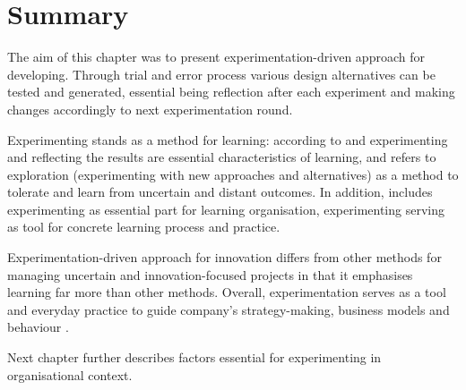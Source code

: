 \section{Summary}
The aim of this chapter was to present experimentation-driven approach for developing. Through trial and error process various design alternatives can be tested and generated, essential being reflection after each experiment and making changes accordingly to next experimentation round.  \citep{thomke1998modes}

Experimenting stands as a method for learning: according to \citet{edmondson1999psychological} and \citet{henderson1990architectural} experimenting and reflecting the results are essential characteristics of learning, and \citet{march1991exploration} refers to exploration (experimenting with new approaches and alternatives) as a method to tolerate and learn from uncertain and distant outcomes. In addition, \citet{garvin2008yours} includes experimenting as essential part for learning organisation, experimenting serving as tool for concrete learning process and practice. 

Experimentation-driven approach for innovation differs from other methods for managing uncertain and innovation-focused projects in that it emphasises learning far more than other methods. Overall, experimentation serves as a tool and everyday practice to guide company's strategy-making, business models and behaviour \citep{davenport2009design,mcgrath2010business}.

Next chapter further describes factors essential for experimenting in organisational context. 